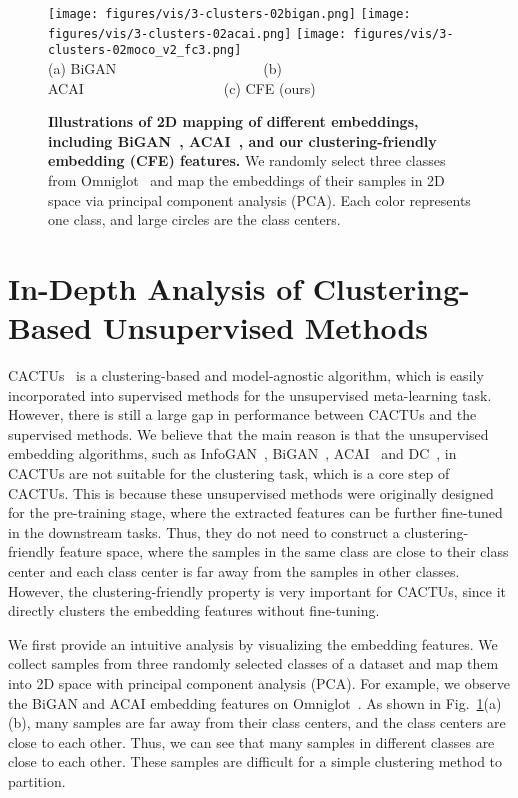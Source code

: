 \documentclass[runningheads]{llncs}
\begin{document}
\begin{figure}[!tbh]
	\centering
	\texttt{[image: figures/vis/3-clusters-02bigan.png]}
	\texttt{[image: figures/vis/3-clusters-02acai.png]}
	\texttt{[image: figures/vis/3-clusters-02moco\_v2\_fc3.png]}\\
	(a) BiGAN~~~~~~~~~~~~~~~~~~~~~(b) ACAI~~~~~~~~~~~~~~~~~~~~(c) CFE (ours)
	
	\caption{\textbf{Illustrations of 2D mapping of different embeddings, including BiGAN~\cite{donahue2016adversarial}, ACAI~\cite{berthelot2018understanding}, and our clustering-friendly embedding (CFE) features.} We randomly select three classes from Omniglot~\cite{lake2011one} and map the embeddings of their samples in 2D space via principal component analysis (PCA). Each color represents one class, and large circles are the class centers.
		\vspace{-2mm}
	}\label{fig:vis}
	\vspace{-2mm}
\end{figure}
\section{In-Depth Analysis of Clustering-Based Unsupervised Methods}


CACTUs~\cite{hsu2018unsupervised} is a clustering-based and model-agnostic algorithm, which is easily incorporated into supervised methods for the unsupervised meta-learning task. However, there is still a large gap in performance between CACTUs and the supervised methods. We believe that the main reason is that the unsupervised embedding algorithms, such as InfoGAN~\cite{chen2016infogan}, BiGAN~\cite{donahue2016adversarial}, ACAI~\cite{berthelot2018understanding} and DC~\cite{caron2018deep}, in CACTUs are not suitable for the clustering task, which is a core step of CACTUs. This is because these unsupervised methods were originally designed for the pre-training stage, where the extracted features can be further fine-tuned in the downstream tasks. Thus, they do not need to construct a clustering-friendly feature space, where the samples in the same class are close to their class center and each class center is far away from the samples in other classes. However, the clustering-friendly property is very important for CACTUs, since it directly clusters the embedding features without fine-tuning. 

We first provide an intuitive analysis by visualizing the embedding features. We collect samples from three randomly selected classes of a dataset and map them into 2D space with principal component analysis (PCA). For example, we observe the BiGAN and ACAI embedding features on Omniglot~\cite{lake2011one}. As shown in Fig.~\ref{fig:vis}(a)(b), many samples are far away from their class centers, and the class centers are close to each other. Thus, we can see that many samples in different classes are close to each other. These samples are difficult for a simple clustering method to partition. 
\end{document}
